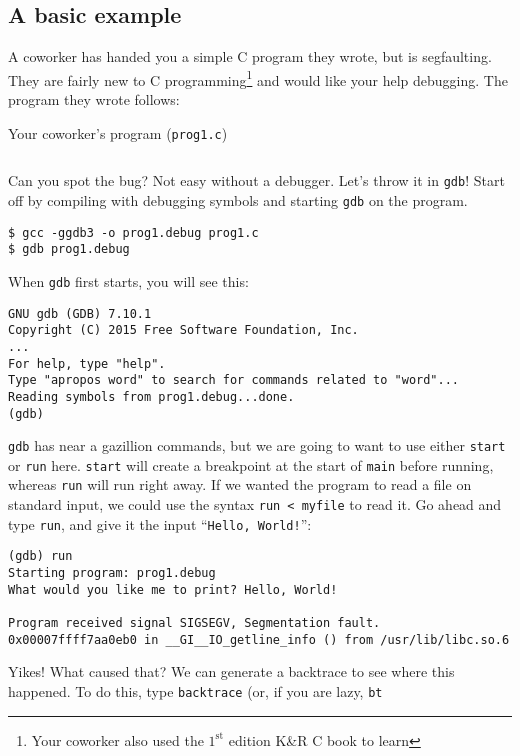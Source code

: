\documentclass[11pt]{article}
\begin{document}
\subsection{A basic example}
A coworker has handed you a simple C program they wrote, but is segfaulting.
They are fairly new to C programming\footnote{Your coworker also used the
$1^{\mathrm{st}}$ edition K\&R C book to learn} and would like your help
debugging. The program they wrote follows:
\begin{listingbox}[left=1cm]{Your coworker's program (\texttt{prog1.c})}
    \inputminted[linenos]{c}{prog1.c}
\end{listingbox}
Can you spot the bug? Not easy without a debugger. Let's throw it in
\texttt{gdb}! Start off by compiling with debugging symbols and starting
\texttt{gdb} on the program.
\begin{termbox}
\begin{verbatim}
$ gcc -ggdb3 -o prog1.debug prog1.c
$ gdb prog1.debug
\end{verbatim}
\end{termbox}
\clearpage
When \texttt{gdb} first starts, you will see this:
\begin{termbox}
\begin{verbatim}
GNU gdb (GDB) 7.10.1
Copyright (C) 2015 Free Software Foundation, Inc.
...
For help, type "help".
Type "apropos word" to search for commands related to "word"...
Reading symbols from prog1.debug...done.
(gdb)
\end{verbatim}
\end{termbox}
\texttt{gdb} has near a gazillion commands, but we are going to want to use
either \texttt{start} or \texttt{run} here. \texttt{start} will create a
breakpoint at the start of \texttt{main} before running, whereas \texttt{run}
will run right away. If we wanted the program to read a file on standard input,
we could use the syntax \texttt{run < myfile} to read it. Go ahead and type
\texttt{run}, and give it the input ``\texttt{Hello, World!}'':
\begin{termbox}
\begin{verbatim}
(gdb) run
Starting program: prog1.debug
What would you like me to print? Hello, World!

Program received signal SIGSEGV, Segmentation fault.
0x00007ffff7aa0eb0 in __GI__IO_getline_info () from /usr/lib/libc.so.6
\end{verbatim}
\end{termbox}
Yikes! What caused that? We can generate a backtrace to see where this
happened. To do this, type \texttt{backtrace} (or, if you are lazy, \texttt{bt}
\end{document}
